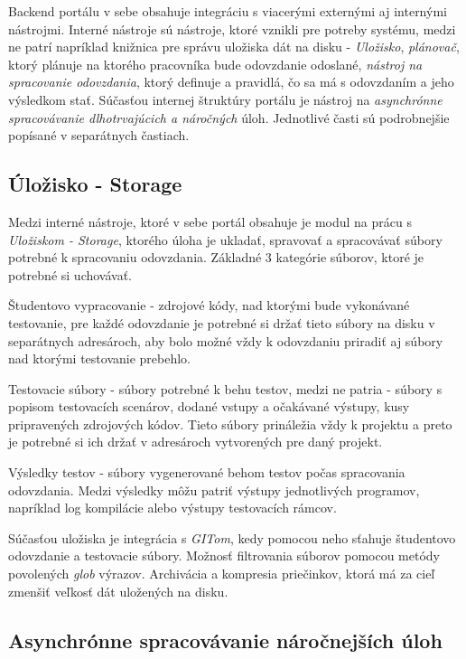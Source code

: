 \documentclass[
  digital, %
  twoside, %
  table,   %
  lof,     %
  lot,     %
]{fithesis3}
\begin{document}
Backend portálu v sebe obsahuje integráciu s viacerými externými aj internými nástrojmi. Interné nástroje sú nástroje, ktoré vznikli pre potreby systému, medzi ne patrí napríklad knižnica pre správu uložiska dát na disku - \emph{Uložisko},
\emph{plánovač}, ktorý plánuje na ktorého pracovníka bude odovzdanie odoslané, \emph{nástroj na spracovanie odovzdania}, ktorý definuje a pravidlá, čo sa má s odovzdaním a jeho výsledkom stať. Súčasťou internej štruktúry portálu je nástroj na \emph{asynchrónne spracovávanie dlhotrvajúcich a náročných} úloh. 
Jednotlivé časti sú podrobnejšie popísané v separátnych častiach. 


\subsection{Úložisko - Storage}

Medzi interné nástroje, ktoré v sebe portál obsahuje je modul na prácu s \emph{Uložiskom - Storage}, ktorého úloha je ukladať, spravovať a spracovávať súbory potrebné k spracovaniu odovzdania. Základné 3 kategórie súborov, ktoré je potrebné si uchovávať. 

Študentovo vypracovanie - zdrojové kódy, nad ktorými bude vykonávané testovanie, pre každé odovzdanie je potrebné si držať tieto súbory na disku v separátnych adresároch, aby bolo možné vždy k odovzdaniu priradiť aj súbory nad ktorými testovanie prebehlo.

Testovacie súbory - súbory potrebné k behu testov, medzi ne patria - súbory s popisom testovacích scenárov, dodané vstupy a očakávané výstupy, kusy pripravených zdrojových kódov. Tieto súbory prináležia vždy k projektu a preto je potrebné si ich držať v adresároch vytvorených pre daný projekt.

Výsledky testov - súbory vygenerované behom testov počas spracovania odovzdania.
Medzi výsledky môžu patriť výstupy jednotlivých programov, napríklad log kompilácie alebo výstupy testovacích rámcov.

Súčasťou uložiska je integrácia s \emph{GITom}, kedy pomocou neho sťahuje študentovo odovzdanie a testovacie súbory. Možnosť filtrovania súborov pomocou metódy povolených \emph{glob} výrazov. Archivácia a kompresia priečinkov, ktorá má za cieľ zmenšiť veľkosť dát uložených na disku.

\subsection{Asynchrónne spracovávanie náročnejších úloh}
\end{document}
